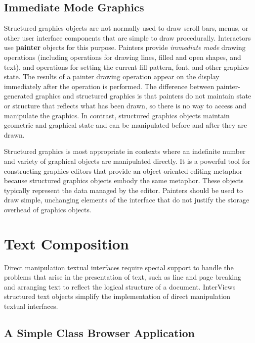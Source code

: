     \subsection{Immediate Mode Graphics}

Structured graphics objects are not normally used to draw scroll bars,
menus, or other user interface components that are simple to draw
procedurally.  Interactors use {\bf painter} objects for this purpose.
Painters provide {\em immediate mode} drawing operations (including
operations for drawing lines, filled and open shapes, and text), and
operations for setting the current fill pattern, font, and other
graphics state.  The results of a painter drawing operation appear
on the display immediately after
the operation is performed.  The difference between
painter-generated graphics and structured graphics is that painters do
not maintain state or structure that reflects what has been drawn, so
there is no way to access and manipulate the graphics.  In contrast,
structured graphics objects maintain geometric and graphical state and
can be manipulated before and after they are drawn.

Structured graphics is most appropriate in contexts where an indefinite
number and variety of graphical objects are manipulated directly.
It is a powerful tool for constructing graphics editors that
provide an object-oriented editing metaphor because structured
graphics objects embody the same metaphor.  These objects typically
represent the data managed by the editor.  Painters should be used to
draw simple, unchanging elements of the interface that do not justify
the storage overhead of graphics objects.

\section{Text Composition}

Direct manipulation textual interfaces require special support to handle
the problems that arise in the presentation of text,
such as line and page breaking and arranging
text to reflect the logical structure of a document.
InterViews structured text objects
simplify the implementation of direct manipulation textual interfaces.

    \subsection{A Simple Class Browser \newline Application}

